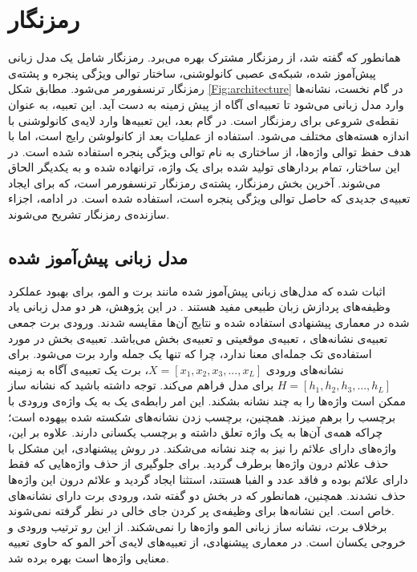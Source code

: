 \section{رمزنگار}
همانطور که گفته شد،  از رمزنگار مشترک بهره می‌برد. رمزنگار شامل یک مدل زبانی پیش‌آموز شده، شبکه‌ی عصبی کانولوشنی، ساختار توالی ویژگی پنجره و پشته‌ی رمزنگار ترنسفورمر می‌شود. مطابق شکل \ref{Fig:architecture} در گام نخست، نشانه‌ها وارد مدل زبانی می‌شود تا تعبیه‌ای آگاه از پیش زمینه به دست آید. این تعبیه، به عنوان نقطه‌ی شروعی برای رمزنگار است. در گام بعد، این تعبیه‌ها وارد لایه‌ی کانولوشنی با اندازه هسته‌های مختلف می‌شود. استفاده از عملیات  بعد از کانولوشن رایج است، اما با هدف حفظ توالی واژه‌ها، از ساختاری به نام توالی ویژگی پنجره استفاده شده است. در این ساختار، تمام بردارهای تولید شده برای یک واژه، ترانهاده شده و به یکدیگر الحاق می‌شوند. آخرین بخش رمزنگار، پشته‌ی رمزنگار ترنسفورمر است، که برای ایجاد تعبیه‌ی جدیدی که حاصل توالی ویژگی پنجره است، استفاده شده است. در ادامه، اجزاء سازنده‌ی رمزنگار تشریح می‌شوند.
\subsection{مدل زبانی پیش‌آموز شده}
اثبات شده که مدل‌های زبانی پیش‌آموز شده مانند برت و المو، برای بهبود عملکرد وظیفه‌های پردازش زبان طبیعی مفید هستند \cite{ethayarajh-2019-contextual}. در این پژوهش، هر دو مدل زبانی یاد شده در معماری پیشنهادی استفاده شده و نتایج آن‌ها مقایسه شدند.
ورودی برت جمعی تعبیه‌ی نشانه‌های  \cite{wordpiece}، تعبیه‌ی موقعیتی و تعبیه‌ی بخش می‌باشد. تعبیه‌ی بخش در مورد استفاده‌ی تک جمله‌ای معنا ندارد، چرا که تنها یک جمله وارد برت می‌شود. برای نشانه‌های ورودی $X=\left [x_{1},x_{2},x_{3},...,x_{L}\right ]$،  برت یک تعبیه‌ی آگاه به زمینه $H=\left [h_{1},h_{2},h_{3},...,h_{L}\right ]$ برای مدل فراهم می‌کند. توجه داشته باشید که نشانه ساز  ممکن است واژه‌ها را به چند نشانه بشکند. این امر رابطه‌ی یک به یک واژه‌ی ورودی با برچسب را برهم میزند. همچنین، برچسب زدن نشانه‌های شکسته شده بیهوده است؛ چراکه همه‌ی آن‌ها به یک واژه تعلق داشته و برچسب یکسانی دارند. علاوه بر این،  واژه‌های دارای علائم را نیز به چند نشانه می‌شکند. در روش پیشنهادی، این مشکل با حذف علائم درون واژه‌ها برطرف گردید. برای جلوگیری از حذف واژه‌هایی که فقط دارای علائم بوده و فاقد عدد و الفبا هستند، استثنا ایجاد گردید و علائم درون این واژه‌ها حذف نشدند. همچنین، همانطور که در بخش دو گفته شد، ورودی برت دارای نشانه‌های خاص است. این نشانه‌ها برای وظیفه‌ی پر کردن جای خالی در نظر گرفته نمی‌شوند.
	\\
برخلاف برت، نشانه ساز زبانی المو واژه‌ها را نمی‌شکند. از این رو ترتیب ورودی و خروجی یکسان است. در معماری پیشنهادی، از تعبیه‌های لایه‌ی آخر المو که حاوی تعبیه معنایی واژه‌ها است بهره برده شد.
